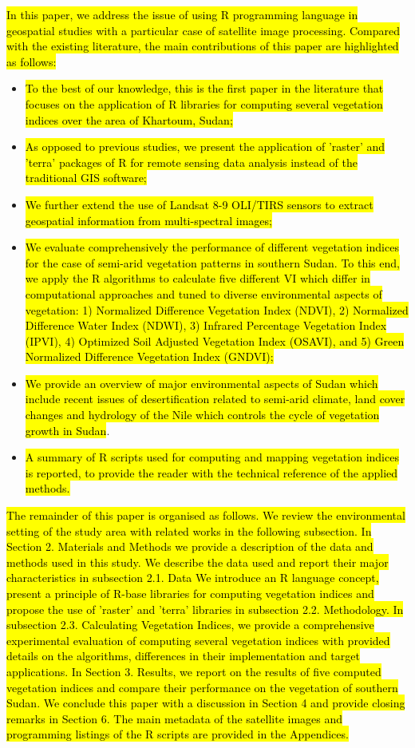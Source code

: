 \documentclass[jimaging,article,submit,pdftex,moreauthors]{Definitions/mdpi}
\begin{document}
\hl{In this paper, we address the issue of using R programming language in geospatial studies with a particular case of satellite image processing. Compared with the existing literature, the main contributions of this paper are highlighted as follows:}
\begin{itemize}
	\item \hl{To the best of our knowledge, this is the first paper in the literature that focuses on the application of R libraries for computing several vegetation indices over the area of Khartoum, Sudan;}
	\item \hl{As opposed to previous studies, we present the application of 'raster' and 'terra' packages of R for remote sensing data analysis instead of the traditional GIS software;}
	\item \hl{We further extend the use of Landsat 8-9 OLI/TIRS sensors to extract geospatial information from multi-spectral images;}
	\item \hl{We evaluate comprehensively the performance of different vegetation indices for the case of semi-arid vegetation patterns in southern Sudan. To this end, we apply the R algorithms to calculate five different VI which differ in computational approaches and tuned to diverse environmental aspects of vegetation: 1) Normalized Difference Vegetation Index (NDVI), 2) Normalized Difference Water Index (NDWI), 3) Infrared Percentage Vegetation Index (IPVI), 4) Optimized Soil Adjusted Vegetation Index (OSAVI), and 5) Green Normalized Difference Vegetation Index (GNDVI);}
	\item \hl{We provide an overview of major environmental aspects of Sudan which include recent issues of desertification related to semi-arid climate, land cover changes and hydrology of the Nile which controls the cycle of vegetation growth in Sudan}.
	\item \hl{A summary of R scripts used for computing and mapping vegetation indices is reported, to provide the reader with the technical reference of the applied methods.}
\end{itemize}

\hl{The remainder of this paper is organised as follows. We review the environmental setting of the study area with related works in the following subsection. In Section 2. Materials and Methods we provide a description of the data and methods used in this study. We describe the data used and report their major characteristics in subsection 2.1. Data We introduce an R language concept, present a principle of R-base libraries for computing vegetation indices and propose the use of 'raster' and 'terra' libraries in subsection 2.2. Methodology. In subsection 2.3. Calculating Vegetation Indices, we provide a comprehensive experimental evaluation of computing several vegetation indices with provided details on the algorithms,  differences in their implementation and target applications. In Section 3. Results, we report on the results of five computed vegetation indices and compare their performance on the vegetation of southern Sudan. We conclude this paper with a discussion in Section 4 and provide closing remarks in Section 6. The main metadata of the satellite images and programming listings of the R scripts are provided in the Appendices.}
\end{document}

